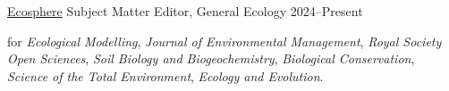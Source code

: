 


\begin{cventries}
  \cventry
    {\href{https://esajournals.onlinelibrary.wiley.com/journal/21508925}{Ecosphere}} %
    {Subject Matter Editor, General Ecology} %
    {2024--Present} %
    {} %
    {}
\end{cventries}

 for \emph{Ecological Modelling}, \emph{Journal of Environmental Management}, \emph{Royal Society Open Sciences}, \emph{Soil Biology and Biogeochemistry}, \emph{Biological Conservation}, \emph{Science of the Total Environment}, \emph{Ecology and Evolution}.

    






